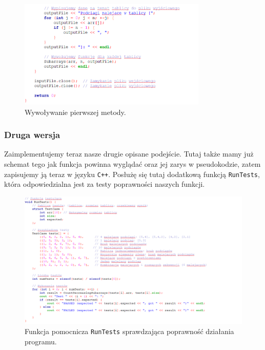 \documentclass[a4paper,12pt]{article}
\begin{document}
\begin{figure}[H]
    \centering
    \includegraphics[width=0.8\textwidth]{Implement4.png}
    \caption{Wywoływanie pierwszej metody.}
    \label{fig:schemat_Implement4}
\end{figure}

\newpage

\subsubsection{Druga wersja}

Zaimplementujemy teraz nasze drugie opisane podejście. Tutaj także mamy już schemat tego jak funkcja powinna wyglądać oraz jej zarys w pseudokodzie, zatem zapisujemy ją teraz w języku \texttt{C++}. Posłużę się tutaj dodatkową funkcją \texttt{RunTests}, która odpowiedzialna jest za testy poprawności naszych funkcji.

\begin{figure}[H]
    \centering
    \includegraphics[width=1\textwidth]{RunTests1.png}
    \caption{Funkcja pomocnicza \texttt{RunTests} sprawdzająca poprawność działania programu.}
    \label{fig:RunTests1}
\end{figure}
\end{document}
